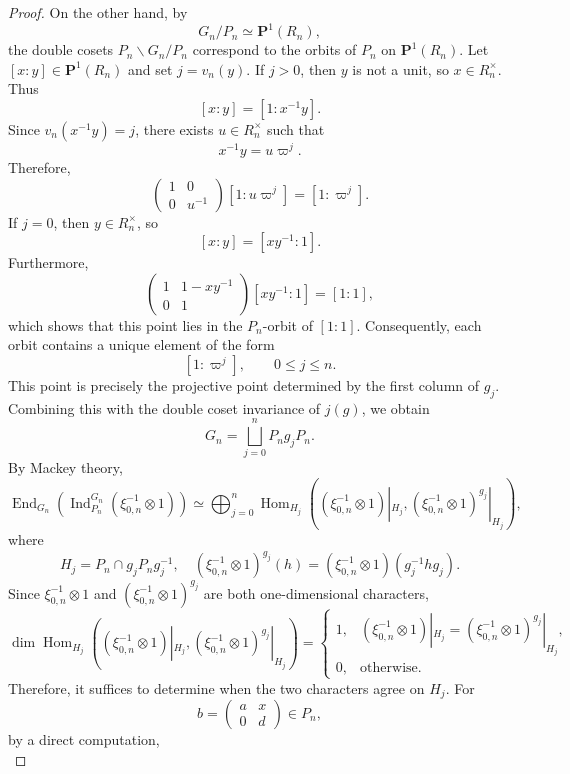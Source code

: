 \documentclass[11pt]{amsart}
\theoremstyle{definition}
\numberwithin{equation}{section}
\begin{document}
\begin{proof}
		On the other hand, by
		\[
		G_n / P_n \simeq \mathbf{P}^1(R_n),
		\]
		the double cosets \(P_n \backslash G_n / P_n\) correspond to the orbits of \(P_n\) on \(\mathbf{P}^1(R_n)\). Let \([x : y] \in \mathbf{P}^1(R_n)\) and set \(j = v_n(y)\). If \(j > 0\), then \(y\) is not a unit, so \(x \in R_n^\times\). Thus
		\[
		[x : y] = [1 : x^{-1}y].
		\]
		Since \(v_n(x^{-1}y) = j\), there exists \(u \in R_n^\times\) such that
		\[
		x^{-1}y = u\varpi^j.
		\]
		Therefore,
		\[
		\begin{pmatrix} 1 & 0 \\ 0 & u^{-1} \end{pmatrix} [1 : u\varpi^j] = [1 : \varpi^j].
		\]
		If \(j = 0\), then \(y \in R_n^\times\), so
		\[
		[x : y] = [xy^{-1} : 1].
		\]
		Furthermore,
		\[
		\begin{pmatrix} 1 & 1 - xy^{-1} \\ 0 & 1 \end{pmatrix} [xy^{-1} : 1] = [1 : 1],
		\]
		which shows that this point lies in the \(P_n\)-orbit of \([1 : 1]\). Consequently, each orbit contains a unique element of the form
		\[
		[1 : \varpi^j], \qquad 0 \leq j \leq n.
		\]
		This point is precisely the projective point determined by the first column of \(g_j\). Combining this with the double coset invariance of \(j(g)\), we obtain
		\[
		G_n= \bigsqcup_{j=0}^n P_n g_j P_n.
		\]
		By Mackey theory,
		\[
		\operatorname{End}_{G_n} \left( \operatorname{Ind}_{P_n}^{G_n}(\xi_{0,n}^{-1} \otimes 1)\right) \simeq \bigoplus_{j=0}^n \operatorname{Hom}_{H_j} ((\xi_{0,n}^{-1} \otimes 1)|_{H_j}, (\xi_{0,n}^{-1} \otimes 1)^{g_j}|_{H_j}),
		\]
		where
		\[
		H_j = P_n \cap g_j P_n g_j^{-1},\quad 
		(\xi_{0,n}^{-1} \otimes 1)^{g_j}(h) = (\xi_{0,n}^{-1} \otimes 1)(g_j^{-1} h g_j).
		\]
		Since \(\xi_{0,n}^{-1} \otimes 1\) and \((\xi_{0,n}^{-1} \otimes 1)^{g_j}\) are both one-dimensional characters,
		\[
		\dim \operatorname{Hom}_{H_j} ((\xi_{0,n}^{-1} \otimes 1)|_{H_j}, (\xi_{0,n}^{-1} \otimes 1)^{g_j}|_{H_j}) = 
		\begin{cases} 
			1, & (\xi_{0,n}^{-1} \otimes 1)|_{H_j} = (\xi_{0,n}^{-1} \otimes 1)^{g_j}|_{H_j}, \\
			0, & \text{otherwise}.
		\end{cases}
		\]
		Therefore, it suffices to determine when the two characters agree on \(H_j\). For
		\[
		b = \begin{pmatrix} a & x \\ 0 & d \end{pmatrix} \in P_n,
		\]
		by a direct computation,
		\[
\]
\end{proof}
\end{document}
